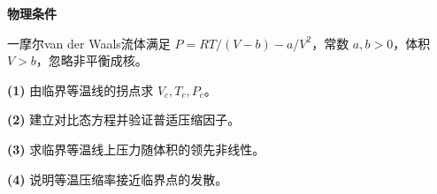\textbf{物理条件}\par 一摩尔van der Waals流体满足 \(P=RT/(V-b)-a/V^2\)，常数 \(a,b>0\)，体积 \(V>b\)，忽略非平衡成核。
\par\noindent\textbf{(1)} 由临界等温线的拐点求 \(V_c,T_c,P_c\)。
\par\noindent\textbf{(2)} 建立对比态方程并验证普适压缩因子。
\par\noindent\textbf{(3)} 求临界等温线上压力随体积的领先非线性。
\par\noindent\textbf{(4)} 说明等温压缩率接近临界点的发散。
